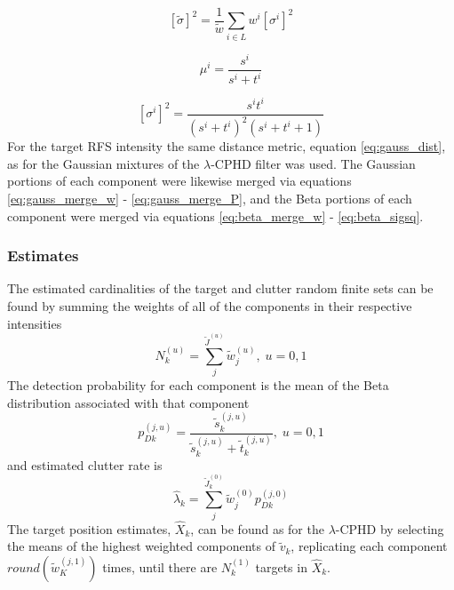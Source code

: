 \documentclass{article}
\newcommand{\clut}{{(0)}}
\newcommand{\tgt}{{(1)}}
\newcommand{\clutj}{{(j,0)}}
\newcommand{\tgtj}{{(j,1)}}
\begin{document}
\begin{equation}
  \label{eq:beta_sigsq_merge}
  \left[ \tilde{\sigma} \right]^2 = \frac{ 1 }{\tilde{w}}\sum_{i \in L}w^i\left[ \sigma^i \right]^2
\end{equation}

\begin{equation}
  \label{eq:beta_mu}
  \mu^i = \frac{s^i}{s^i + t^i}
\end{equation}

\begin{equation}
  \label{eq:beta_sigsq}
  \left[ \sigma^i \right]^2 =
  \frac{ s^i t^i }{ \left( s^i + t^i\right) ^2 \left( s^i + t^i + 1 \right) }
\end{equation}
For the target RFS intensity the same distance metric, equation \eqref{eq:gauss_dist}, as for the Gaussian mixtures of the $\lambda$-CPHD filter was used. The Gaussian portions of each component were likewise merged via equations \eqref{eq:gauss_merge_w} - \eqref{eq:gauss_merge_P}, and the Beta portions of each component were merged via equations \eqref{eq:beta_merge_w} - \eqref{eq:beta_sigsq}.


\subsubsection*{Estimates}
The estimated cardinalities of the target and clutter random finite sets can be found by summing the weights of all of the components in their respective intensities
\begin{equation}
  \label{eq:lpd_N}
  N_k^{(u)} = \sum_j^{\tilde{J}^{(u)}}\tilde{w}^{(u)}_j,\;u=0,1
\end{equation}
The detection probability for each component is the mean of the Beta distribution associated with that component
\begin{equation}
  \label{eq:pdk}
  p_{Dk}^{(j,u)} = \frac{ \tilde{s}_{k}^{(j, u)}}{\tilde{s}_{k}^{(j, u)} + \tilde{t}_{k}^{(j, u)}},\;u=0,1
\end{equation}
and estimated clutter rate is
\begin{equation}
  \label{eq:lpd_lambda_hat}
  \hat{\lambda}_k = \sum_j^{\tilde{J}_k^\clut}\tilde{w}^\clut_jp_{Dk}^\clutj 
\end{equation}
The target position estimates, $\hat{X}_k$, can be found as for the $\lambda$-CPHD by selecting the means of the highest weighted components of $\tilde{v}_k$, replicating each component $round(\tilde{w}_K^\tgtj)$ times, until there are $N_k^\tgt$ targets in $\hat{X}_k$.
\end{document}
